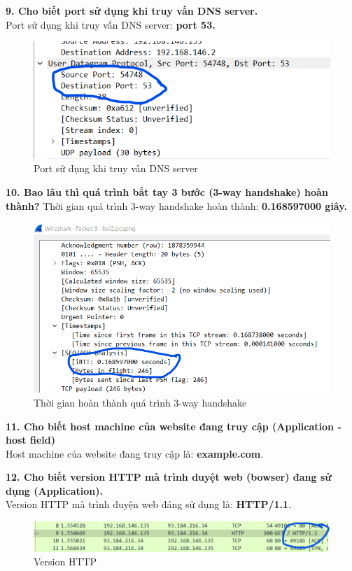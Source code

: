 \textbf{9.	Cho biết port sử dụng khi truy vấn DNS server.}\\
Port sử dụng khi truy vấn DNS server: \textbf{port 53.}
\begin{figure}[H]
\begin{center}
\includegraphics[scale=1]{../figures/p2/p2_dnsport}
\end{center}
\caption{Port sử dụng khi truy vấn DNS server}
\end{figure}

\textbf{10. Bao lâu thì quá trình bắt tay 3 bước (3-way handshake) hoàn thành?}
Thời gian quá trình 3-way handshake hoàn thành: \textbf{0.168597000 giây.}
\begin{figure}[H]
\begin{center}
\includegraphics[scale=1]{../figures/p2/p2_handshake}
\end{center}
\caption{Thời gian hoàn thành quá trình 3-way handshake}
\end{figure}

\textbf{11.	 Cho biết host machine của website đang truy cập (Application - host field)}\\
Host machine của website đang truy cập là: \textbf{example.com}.

\textbf{12. Cho biết version HTTP mà trình duyệt web (bowser) đang sử dụng (Application).}\\
Version HTTP mà trình duyện web đáng sử dụng là: \textbf{HTTP/1.1}.
\begin{figure}[H]
\begin{center}
\includegraphics[scale=1]{../figures/p2/p2_httpversion}
\end{center}
\caption{Version HTTP}
\end{figure}

